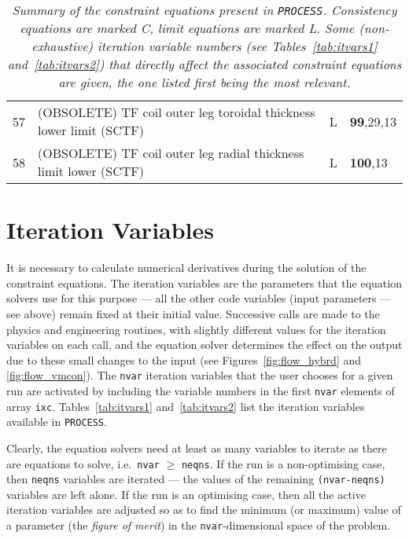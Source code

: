\documentclass[11pt,a4paper]{report}
\newcommand{\process}{\mbox{\texttt{PROCESS}}}
\begin{document}
\begin{table}[tbph]
\begin{center}
\begin{tabular}{||c|l|c|l||}
57  & (OBSOLETE) TF coil outer leg toroidal thickness lower limit (SCTF)   & L    & \textbf{99},29,13  \\
58  & (OBSOLETE) TF coil outer leg radial thickness limit lower (SCTF)     & L    & \textbf{100},13 \\
\hline
\end{tabular}
\end{center}
\caption[List of constraint equations]
{\label{tab:eqns}
  \textit{Summary of the constraint equations present in \process. Consistency
    equations are marked C, limit equations are marked L\@. Some
    (non-exhaustive) iteration variable numbers (see Tables~\ref{tab:itvars1}
    and~\ref{tab:itvars2}) that directly affect the associated constraint
    equations are given, the one listed first being the most relevant.}
}
\normalsize
\end{table}

\section{Iteration Variables}
\label{sec:itvars}

It is necessary to calculate numerical derivatives during the solution of the
constraint equations. The iteration variables are the parameters that the
equation solvers use for this purpose --- all the other code variables (input
parameters --- see above) remain fixed at their initial value. Successive
calls are made to the physics and engineering routines, with slightly
different values for the iteration variables on each call, and the equation
solver determines the effect on the output due to these small changes to the
input (see Figures~\ref{fig:flow_hybrd} and \ref{fig:flow_vmcon}). The
\texttt{nvar} iteration variables that the user chooses for a given run are
activated by including the variable numbers in the first \texttt{nvar}
elements of array \texttt{ixc}. Tables~\ref{tab:itvars1} and~\ref{tab:itvars2}
list the iteration variables available in \process.

Clearly, the equation solvers need at least as many variables to iterate as
there are equations to solve, i.e.\ \texttt{nvar} $\geq$ \texttt{neqns}. If
the run is a non-optimising case, then \texttt{neqns} variables are iterated
--- the values of the remaining \texttt{(nvar-neqns)} variables are left
alone. If the run is an optimising case, then all the active iteration
variables are adjusted so as to find the minimum (or maximum) value of a
parameter (the \textit{ figure of merit}) in the \texttt{nvar}-dimensional
space of the problem.
\end{document}
